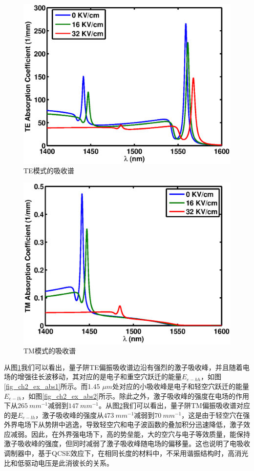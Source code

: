 \begin{figure}[htb]
	\centering
	\includegraphics[width=12cm]{./Pictures/fig_ch2_te_abs.eps}
	\caption{TE模式的吸收谱}
	\label{fig_ch2_te_abs}
\end{figure}
\begin{figure}[htb]
	\centering
	\includegraphics[width=12cm]{./Pictures/fig_ch2_tm_abs.eps}
	\caption{TM模式的吸收谱}
	\label{fig_ch2_tm_abs}
\end{figure}

从图\ref{fig_ch2_te_abs}我们可以看出，量子阱TE偏振吸收谱边沿有强烈的激子吸收峰，并且随着电场的增强往长波移动，其对应的是电子和重空穴跃迁的能量$E_{e-hh}$，如图\ref{fig_ch2_ex_abs1}所示。而1.45 $\mu m$处对应的小吸收峰是电子和轻空穴跃迁的能量$E_{e-lh}$，如图\ref{fig_ch2_ex_abs2}所示。除此之外，激子吸收峰的强度在电场的作用下从$265~mm^{-1}$减弱到$147~mm^{-1}$。从图\ref{fig_ch2_tm_abs}我们可以看出，量子阱TM偏振吸收谱对应的是$E_{e-lh}$，激子吸收峰的强度从$473~ mm^{-1}$减弱到$70~ mm^{-1}$，这是由于轻空穴在强外界电场下从势阱中逃逸，导致轻空穴和电子波函数的叠加积分迅速降低，激子效应减弱。因此，在外界强电场下，高的势垒能，大的空穴与电子等效质量，能保持激子吸收峰的强度，但同时减弱了激子吸收峰随电场的偏移量。这也说明了电吸收调制器中，基于QCSE效应下，在相同长度的材料中，不采用谐振结构时，高消光比和低驱动电压是此消彼长的关系。

